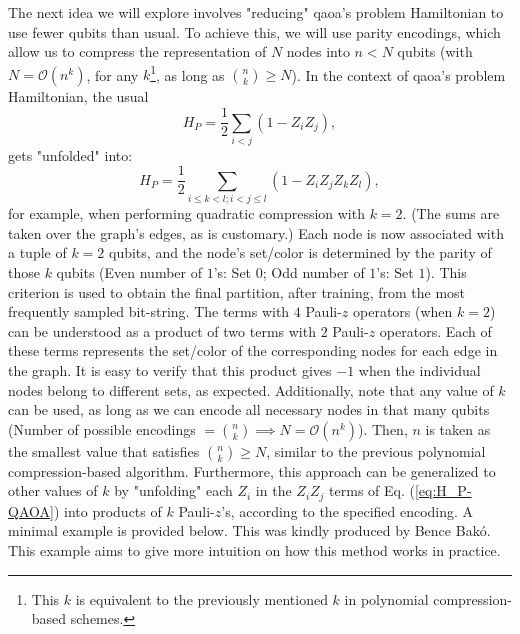 The next idea we will explore involves "reducing" \acrshort{qaoa}'s problem Hamiltonian to use fewer qubits than usual. To achieve this, we will use parity encodings, which allow us to compress the representation of \(N\) nodes into \(n < N\) qubits (with \(N = \mathcal{O}(n^k)\), for any \(k\)\footnote{This $k$ is equivalent to the previously mentioned $k$ in polynomial compression-based schemes.}, as long as \(\binom{n}{k} \geq N\)). In the context of \acrshort{qaoa}'s problem Hamiltonian, the usual
\begin{equation}\label{eq:H_P-QAOA}
    H_P = \frac{1}{2}\sum\limits_{i<j}(1-Z_iZ_j),
\end{equation}
gets "unfolded" into:
\begin{equation}\label{eq:H_P-QAOA-k=2}
    H_P = \frac{1}{2}\sum\limits_{i \leq k<l;i<j \leq l}(1-Z_iZ_jZ_kZ_l),
\end{equation}
for example, when performing quadratic compression with \(k = 2\). (The sums are taken over the graph's edges, as is customary.) Each node is now associated with a tuple of \(k = 2\) qubits, and the node's set/color is determined by the parity of those \(k\) qubits (Even number of $1$'s: Set $0$; Odd number of $1$'s: Set $1$). This criterion is used to obtain the final partition, after training, from the most frequently sampled bit-string. The terms with $4$ Pauli-$z$ operators (when \(k = 2\)) can be understood as a product of two terms with $2$ Pauli-$z$ operators. Each of these terms represents the set/color of the corresponding nodes for each edge in the graph. It is easy to verify that this product gives $-1$ when the individual nodes belong to different sets, as expected. Additionally, note that any value of \(k\) can be used, as long as we can encode all necessary nodes in that many qubits (Number of possible encodings \(= \binom{n}{k} \implies N = \mathcal{O}(n^k)\)). Then, \(n\) is taken as the smallest value that satisfies \(\binom{n}{k} \geq N\), similar to the previous polynomial compression-based algorithm. Furthermore, this approach can be generalized to other values of \(k\) by "unfolding" each \(Z_i\) in the \(Z_i Z_j\) terms of Eq. (\ref{eq:H_P-QAOA}) into products of \(k\) Pauli-$z$'s, according to the specified encoding. A minimal example is provided below. This was kindly produced by Bence Bakó. This example aims to give more intuition on how this method works in practice.

